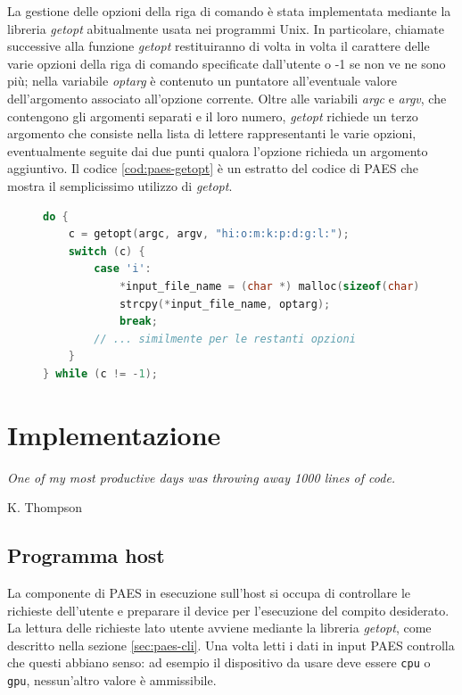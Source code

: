 \documentclass[12pt,a4paper,oneside]{book}
\begin{document}
La gestione delle opzioni della riga di comando è stata implementata mediante la libreria \textit{getopt} abitualmente usata nei programmi Unix. In particolare, chiamate successive alla funzione \textit{getopt} restituiranno di volta in volta il carattere delle varie opzioni della riga di comando specificate dall'utente o -1 se non ve ne sono più; nella variabile \textit{optarg} è contenuto un puntatore all'eventuale valore dell'argomento associato all'opzione corrente. Oltre alle variabili \textit{argc} e \textit{argv}, che contengono gli argomenti separati e il loro numero, \textit{getopt} richiede un terzo argomento che consiste nella lista di lettere rappresentanti le varie opzioni, eventualmente seguite dai due punti qualora l'opzione richieda un argomento aggiuntivo. Il codice \ref{cod:paes-getopt} è un estratto del codice di PAES che mostra il semplicissimo utilizzo di \textit{getopt}.

\vspace*{10pt}
\begin{figure}
\begin{lstlisting}[caption={\textit{Lettura delle opzioni della riga di comando in PAES.}},label={cod:paes-getopt},language=C]
do {
	c = getopt(argc, argv, "hi:o:m:k:p:d:g:l:");	
	switch (c) {
		case 'i':
			*input_file_name = (char *) malloc(sizeof(char) * strlen(optarg) + 1);
			strcpy(*input_file_name, optarg);
			break;
		// ... similmente per le restanti opzioni
	}
} while (c != -1);
\end{lstlisting}
\end{figure}

\chapter{Implementazione}
\linespread{1}
\epigraph{\textit{One of my most productive days was throwing away 1000 lines of code.}}{K. Thompson}
\linespread{1.3}

\section{Programma host}

La componente di PAES in esecuzione sull'host si occupa di controllare le richieste dell'utente e preparare il device per l'esecuzione del compito desiderato. La lettura delle richieste lato utente avviene mediante la libreria \textit{getopt}, come descritto nella sezione \ref{sec:paes-cli}. Una volta letti i dati in input PAES controlla che questi abbiano senso: ad esempio il dispositivo da usare deve essere \verb|cpu| o \verb|gpu|, nessun'altro valore è ammissibile.
\end{document}
